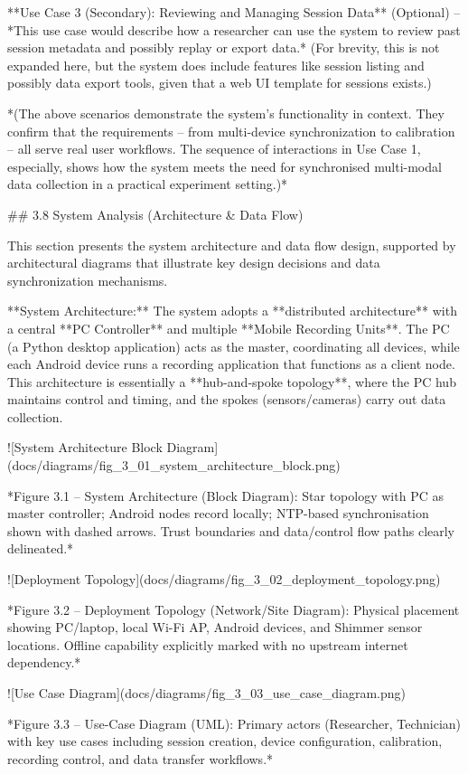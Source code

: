 \documentclass[12pt,a4paper]{article}
\begin{document}
**Use Case 3 (Secondary): Reviewing and Managing Session Data**
(Optional) -- *This use case would describe how a researcher can use the
system to review past session metadata and possibly replay or export
data.* (For brevity, this is not expanded here, but the system does
include features like session listing and possibly data export tools,
given that a web UI template for sessions exists.)

*(The above scenarios demonstrate the system's functionality in context.
They confirm that the requirements -- from multi-device synchronization
to calibration -- all serve real user workflows. The sequence of
interactions in Use Case 1, especially, shows how the system meets the
need for synchronised multi-modal data collection in a practical
experiment setting.)*

## 3.8 System Analysis (Architecture & Data Flow)

This section presents the system architecture and data flow design, supported by architectural diagrams that illustrate key design decisions and data synchronization mechanisms.

**System Architecture:** The system adopts a **distributed architecture** with a central **PC Controller** and multiple **Mobile Recording Units**. The PC (a Python desktop application) acts as the master, coordinating all devices, while each Android device runs a recording application that functions as a client node. This architecture is essentially a **hub-and-spoke topology**, where the PC hub maintains control and timing, and the spokes (sensors/cameras) carry out data collection.

![System Architecture Block Diagram](docs/diagrams/fig_3_01_system_architecture_block.png)

*Figure 3.1 – System Architecture (Block Diagram): Star topology with PC as master controller; Android nodes record locally; NTP-based synchronisation shown with dashed arrows. Trust boundaries and data/control flow paths clearly delineated.*

![Deployment Topology](docs/diagrams/fig_3_02_deployment_topology.png)

*Figure 3.2 – Deployment Topology (Network/Site Diagram): Physical placement showing PC/laptop, local Wi-Fi AP, Android devices, and Shimmer sensor locations. Offline capability explicitly marked with no upstream internet dependency.*

![Use Case Diagram](docs/diagrams/fig_3_03_use_case_diagram.png)

*Figure 3.3 – Use-Case Diagram (UML): Primary actors (Researcher, Technician) with key use cases including session creation, device configuration, calibration, recording control, and data transfer workflows.*
\end{document}

